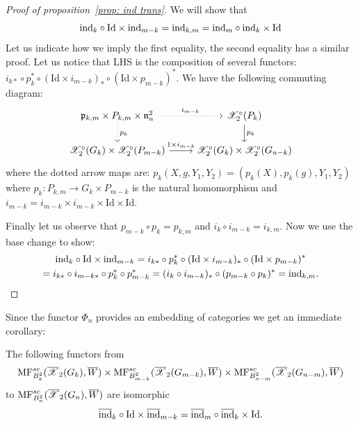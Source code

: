 \begin{proof}[Proof of proposition~\ref{prop: ind trans}]
We  will show that
 $$\mathrm{ind}_k\circ \mathrm{Id}\times \mathrm{ind}_{m-k}=\mathrm{ind}_{k,m}=\mathrm{ind}_m\circ \mathrm{ind}_k\times \mathrm{Id}$$
Let us indicate how we imply the first equality, the second equality has a similar proof. Let us notice that LHS is the composition of several functors:
$i_{k*}\circ p_k^*\circ(\mathrm{Id}\times i_{m-k})_*\circ (\mathrm{Id}\times p_{m-k})^*$.  We have  the
following commuting diagram:
$$ \begin{tikzcd}
 \frp_{k,m}\times P_{k,m}\times \frn_n^2 \arrow[dotted]{r}{i_{m-k}}\arrow[dotted]{d}{p_k}   & \calX^\circ_2(P_k)\arrow{d}{p_k}\\
\calX_2^\circ(G_k)\times \calX_2^\circ(P_{m-k})\arrow{r}{1\times i_{m-k}} &                                  \calX^\circ_2(G_k)\times \calX^\circ_2(G_{n-k})
 \end{tikzcd}$$
where the dotted arrow maps are: $p_k(X,g,Y_1,Y_2)=(p_k(X),p_k(g),Y_1,Y_2)$ where $p_k:P_{k,m}\to G_k\times P_{m-k}$ is the natural homomorphism and
$i_{m-k}=i_{m-k}\times i_{m-k}\times \mathrm{Id} \times \mathrm{Id}$.


Finally let us observe that $p_{m-k}\circ p_k= p_{k,m}$ and $i_k\circ i_{m-k}=i_{k,m}$. Now we use the base change to show:
\begin{multline*}
\mathrm{ind}_k\circ \mathrm{Id}\times \mathrm{ind}_{m-k}= i_{k*}\circ p_k^*\circ (\mathrm{Id}\times i_{m-k})_*\circ (\mathrm{Id}\times p_{m-k})^*\\= i_{k*}\circ i_{m-k*}\circ p_k^*\circ p_{m-k}^*=
(i_{k}\circ i_{m-k})_*\circ (p_{m-k}\circ p_k)^*
=\mathrm{ind}_{k,m}.\end{multline*}
\end{proof}

Since the functor $\Phi_n$ provides an embedding of categories we get an immediate corollary:

\begin{corollary} The following functors from 
\[\mathrm{MF}^{sc}_{B_k^2}(\overline{\mathscr{X}}_2(G_k),\overline{W})\times \mathrm{MF}^{sc}_{B_{m-k}^2}(\overline{\mathscr{X}}_2(G_{m-k}),\overline{W})\times \mathrm{MF}^{sc}_{B_{n-m}^2}(\overline{\mathscr{X}}_2(G_{n-m}),\overline{W})\] to \(\mathrm{MF}^{sc}_{B_n^2}(\overline{\mathscr{X}}_2(G_n),\overline{W})\)
 are isomorphic
$$ \overline{\mathrm{ind}}_k\circ \mathrm{Id}\times \overline{\mathrm{ind}}_{m-k}=\overline{\mathrm{ind}}_m\circ \overline{\mathrm{ind}}_k\times \mathrm{Id}.$$
\end{corollary}

